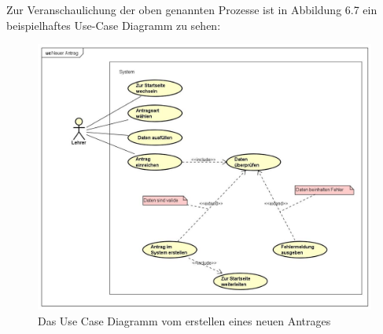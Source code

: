 Zur Veranschaulichung der oben genannten Prozesse ist in Abbildung 6.7 ein beispielhaftes Use-Case Diagramm zu sehen: 
\begin{figure}[H]
	\centering
	\includegraphics[width=1\linewidth]{images/uc-new}
	\caption[Use Case Diagramm Neuer Antrag]{Das Use Case Diagramm vom erstellen eines neuen Antrages}
	\label{fig:ucStart}
\end{figure}
\newpage
